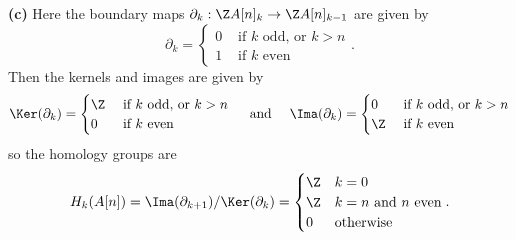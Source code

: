 \documentclass[11pt,letterpaper]{article}
\begin{document}
\begin{solution}
    \textbf{(c)} Here the boundary maps $\partial_k : \Z A[n]_k \to \Z A[n]_{k-1}$ are given by
    \[
        \partial_k = \begin{cases}
            0&\textrm{ if }k\textrm{ odd, or } k>n\\
            1&\textrm{ if }k\textrm{ even}
        \end{cases}
    .\] 
    Then the kernels and images are given by
    \[
        \Ker(\partial_k) = \begin{cases}
            \Z&\textrm{ if }k\textrm{ odd, or } k>n\\
            0 &\textrm{ if }k\textrm{ even}
        \end{cases}\quad \textrm{ and }\quad\Ima(\partial_k)=\begin{cases}
            0&\textrm{ if }k\textrm{ odd, or } k>n\\
            \Z&\textrm{ if }k\textrm{ even}
        \end{cases}
    \] 
    so the homology groups are 
    \[
        H_k(A[n])=\Ima(\partial_{k+1}) /\Ker(\partial_k)=\begin{cases}
            \Z & k=0\\
            \Z & k=n \textrm{ and }n\textrm{ even}\\
            0 & \textrm{otherwise}
        \end{cases}
    .\]
\end{solution}
\end{document}
